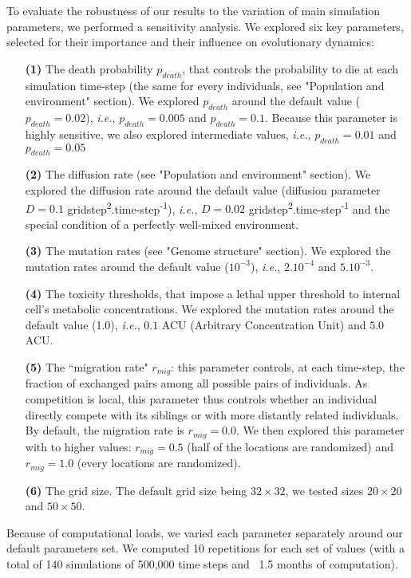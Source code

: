 
To evaluate the robustness of our results to the variation of main simulation parameters, we performed a sensitivity analysis. We explored six key parameters, selected for their importance and their influence on evolutionary dynamics:
\begin{enumerate}
\item[\textbf{(1)}] The death probability $p_{death}$, that controls the probability to die at each simulation time-step (the same for every individuals, see "Population and environment" section). We explored $p_{death}$ around the default value ($p_{death}=0.02$), \textit{i.e.}, $p_{death}=0.005$ and $p_{death}=0.1$. Because this parameter is highly sensitive, we also explored intermediate values, \textit{i.e.}, $p_{death}=0.01$ and $p_{death}=0.05$
\item[\textbf{(2)}] The diffusion rate (see "Population and environment" section). We explored the diffusion rate around the default value (diffusion parameter $D=0.1$ gridstep\textsuperscript{2}.time-step\textsuperscript{-1}), \textit{i.e.}, $D=0.02$ gridstep\textsuperscript{2}.time-step\textsuperscript{-1} and the special condition of a perfectly well-mixed environment.
\item[\textbf{(3)}] The mutation rates (see "Genome structure" section). We explored the mutation rates around the default value ($10^{-3}$), \textit{i.e.}, $2.10^{-4}$ and $5.10^{-3}$.
\item[\textbf{(4)}] The toxicity thresholds, that impose a lethal upper threshold to internal cell's metabolic concentrations. We explored the mutation rates around the default value (1.0), \textit{i.e.}, $0.1$ ACU (Arbitrary Concentration Unit) and $5.0$ ACU.
\item[\textbf{(5)}] The ``migration rate" $r_{mig}$: this parameter controls, at each time-step, the fraction of exchanged pairs among all possible pairs of individuals. As competition is local, this parameter thus controls whether an individual directly compete with its siblings or with more distantly related individuals. By default, the migration rate is $r_{mig}=0.0$. We then explored this parameter with to higher values: $r_{mig}=0.5$ (half of the locations are randomized) and $r_{mig}=1.0$ (every locations are randomized).
\item[\textbf{(6)}] The grid size. The default grid size being $32\times32$, we tested sizes $20\times20$ and $50\times50$.
\end{enumerate}
Because of computational loads, we varied each parameter separately around our default parameters set. We computed 10 repetitions for each set of values (with a total of 140 simulations of 500,000 time steps and ~1.5 months of computation).

